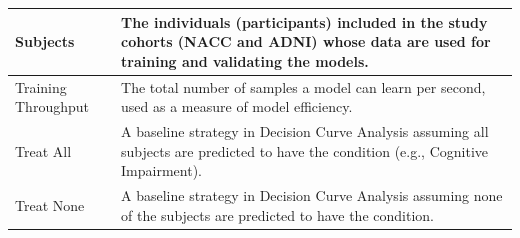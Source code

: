 \begin{longtable}{|M{3cm}|M{9.5cm}|}
        Subjects & The individuals (participants) included in the study cohorts (NACC and ADNI) whose data are used for training and validating the models. \\ \hline
        Training Throughput & The total number of samples a model can learn per second, used as a measure of model efficiency. \\ \hline
        Treat All & A baseline strategy in Decision Curve Analysis assuming all subjects are predicted to have the condition (e.g., Cognitive Impairment). \\ \hline
        Treat None & A baseline strategy in Decision Curve Analysis assuming none of the subjects are predicted to have the condition. \\ \hline
   
\end{longtable}